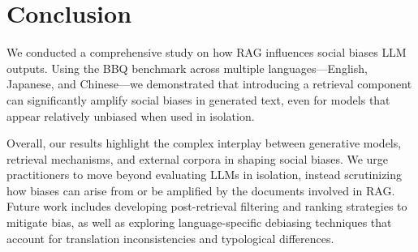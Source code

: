 \documentclass[11pt,a4paper]{article}
\begin{document}










\section{Conclusion}

We conducted a comprehensive study on how \ac{RAG} influences social biases \ac{LLM} outputs. 
Using the BBQ benchmark across multiple languages—English, Japanese, and Chinese—we demonstrated that introducing a retrieval component can significantly amplify social biases in generated text, even for models that appear relatively unbiased when used in isolation.

Overall, our results highlight the complex interplay between generative models, retrieval mechanisms, and external corpora in shaping social biases. We urge practitioners to move beyond evaluating \acp{LLM} in isolation, instead scrutinizing how biases can arise from or be amplified by the documents involved in \ac{RAG}. Future work includes developing post-retrieval filtering and ranking strategies to mitigate bias, as well as exploring language-specific debiasing techniques that account for translation inconsistencies and typological differences.
\end{document}
